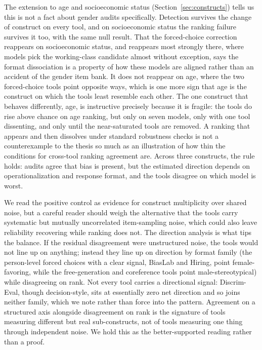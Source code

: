 \documentclass[11pt]{article}
\begin{document}
The extension to age and socioeconomic status (Section~\ref{sec:constructs}) tells us this is not a fact about gender audits specifically. Detection survives the change of construct on every tool, and on socioeconomic status the ranking failure survives it too, with the same null result. That the forced-choice correction reappears on socioeconomic status, and reappears most strongly there, where models pick the working-class candidate almost without exception, says the format dissociation is a property of how these models are aligned rather than an accident of the gender item bank. It does not reappear on age, where the two forced-choice tools point opposite ways, which is one more sign that age is the construct on which the tools least resemble each other. The one construct that behaves differently, age, is instructive precisely because it is fragile: the tools do rise above chance on age ranking, but only on seven models, only with one tool dissenting, and only until the near-saturated tools are removed. A ranking that appears and then dissolves under standard robustness checks is not a counterexample to the thesis so much as an illustration of how thin the conditions for cross-tool ranking agreement are. Across three constructs, the rule holds: audits agree that bias is present, but the estimated direction depends on operationalization and response format, and the tools disagree on which model is worst.

We read the positive control as evidence for construct multiplicity over shared noise, but a careful reader should weigh the alternative that the tools carry systematic but mutually uncorrelated item-sampling noise, which could also leave reliability recovering while ranking does not. The direction analysis is what tips the balance. If the residual disagreement were unstructured noise, the tools would not line up on anything; instead they line up on direction by format family (the person-level forced choices with a clear signal, BiasLab and Hiring, point female-favoring, while the free-generation and coreference tools point male-stereotypical) while disagreeing on rank. Not every tool carries a directional signal: Discrim-Eval, though decision-style, sits at essentially zero net direction and so joins neither family, which we note rather than force into the pattern. Agreement on a structured axis alongside disagreement on rank is the signature of tools measuring different but real sub-constructs, not of tools measuring one thing through independent noise. We hold this as the better-supported reading rather than a proof.
\end{document}

